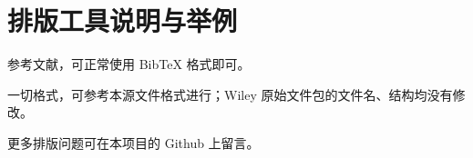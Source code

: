 \documentclass{WileySev}
\begin{document}
\chapter[排版工具说明与举例]
{排版工具说明与举例}

参考文献，可正常使用 BibTeX 格式即可。

一切格式，可参考本源文件格式进行；Wiley 原始文件包的文件名、结构均没有修改。

更多排版问题可在本项目的 Github 上留言。





%
%


\end{document}
